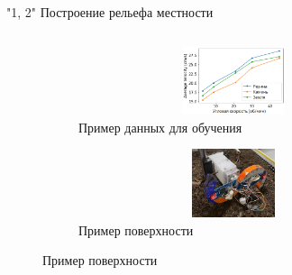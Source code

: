 \begin{frame}[t]{"1, 2" Построение рельефа местности}
\begin{columns}[T,onlytextwidth]
\begin{column}{0.49\textwidth}
            \vspace{-0.35cm}
            \begin{figure}[H]
                \begin{subfigure}{0.49\textwidth}
                    \centering\includegraphics[height=2cm,width=1\textwidth,keepaspectratio]{../images/slides/avg_lin_vel_rev_min.png}
                    \caption*{Пример данных для обучения}
                \end{subfigure}
                \begin{subfigure}{0.49\textwidth}
                    \centering\includegraphics[height=2cm,width=1\textwidth,keepaspectratio]{../images/slides/data.png}
                    \caption*{Пример поверхности}
                \end{subfigure}
            \end{figure}
        \end{column}
    \end{columns}
\end{frame}

